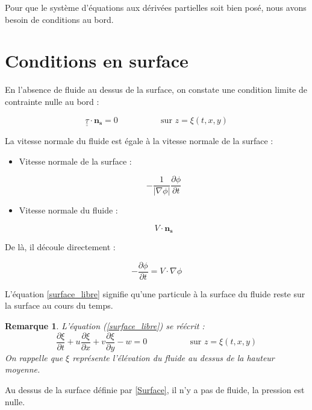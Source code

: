 \documentclass[10pt,a4paper]{amsart}
\newtheorem{remarque}{Remarque}
\begin{document}
Pour que le système d'équations aux dérivées partielles soit bien posé, nous avons besoin de conditions au bord.

\section{Conditions en surface}

En l'absence de fluide au dessus de la surface, on constate une condition limite de contrainte nulle au bord :

\begin{equation}\label{tenseur_surface}
\underline{\underline{\tau}} \cdot \mathbf{n_s} = 0 \hspace{2cm} \text{ sur } z=\xi(t,x,y)
\end{equation}

La vitesse normale du fluide est égale à la vitesse normale de la surface :

\begin{itemize}
\item Vitesse normale de la surface :

$$-\dfrac{1}{| \nabla \phi |} \dfrac{\partial \phi}{\partial t}$$

\item Vitesse normale du fluide :

$$V \cdot \mathbf{n_s}$$

\end{itemize}

De là, il découle directement :

\begin{equation} \label{surface_libre}
-\dfrac{\partial \phi}{\partial t} = V \cdot \nabla \phi
\end{equation}

L'équation \eqref{surface_libre} signifie qu'une particule à la surface du fluide reste sur la surface au cours du temps.

\begin{remarque}
L'équation (\ref{surface_libre}) se réécrit :
$$\dfrac{\partial \xi}{\partial t} + u \dfrac{\partial \xi}{\partial x} + v \dfrac{\partial \xi}{\partial y} - w = 0 \hspace{2cm} \text{ sur } z=\xi(t,x,y)$$
On rappelle que $\xi$ représente l'élévation du fluide au dessus de la hauteur moyenne.
\end{remarque}

Au dessus de la surface définie par \eqref{Surface}, il n'y a pas de fluide, la pression est nulle.
\end{document}

